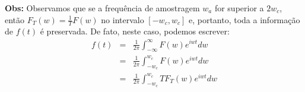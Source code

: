 \documentclass[a4paper,10pt]{book}
\newcommand{\sen}{\operatorname{sen}\,}
\begin{document}
 {\bf Obs:} Observamos que se a frequência de amostragem $w_a$ for superior a $2w_c$, então $F_T(w)=\frac{1}{T}F(w)$ no intervalo $[-w_c,w_c]$ e, portanto, toda a informação de $f(t)$ é preservada. De fato, neste caso, podemos escrever:
 \begin{eqnarray*}
 f(t)&=&\frac{1}{2\pi}\int_{-\infty}^\infty F(w)e^{iwt}dw\\
 &=&\frac{1}{2\pi}\int_{-w_c}^{w_c} F(w)e^{iwt}dw\\
 &=&\frac{1}{2\pi}\int_{-w_c}^{w_c} TF_T(w)e^{iwt}dw
 \end{eqnarray*}
\end{document}
